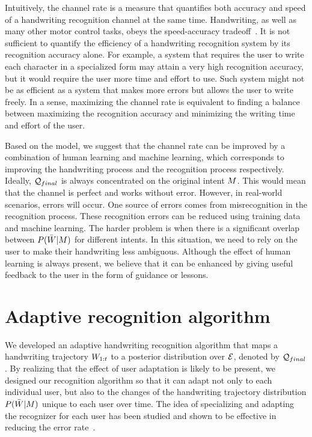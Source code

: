 \documentclass{sigchi}
\begin{document}
Intuitively, the channel rate is a measure that quantifies both
accuracy and speed of a handwriting recognition channel at the same
time. Handwriting, as well as many other motor control tasks, obeys
the speed-accuracy tradeoff~\cite{Fitts1954}. It is not sufficient to
quantify the efficiency of a handwriting recognition system by its
recognition accuracy alone. For example, a system that requires the
user to write each character in a specialized form may attain a very
high recognition accuracy, but it would require the user more time and
effort to use. Such system might not be as efficient as a system that
makes more errors but allows the user to write freely. In a sense,
maximizing the channel rate is equivalent to finding a balance between
maximizing the recognition accuracy and minimizing the writing time
and effort of the user.

Based on the model, we suggest that the channel rate can be improved
by a combination of human learning and machine learning, which
corresponds to improving the handwriting process and the recognition
process respectively. Ideally, $\mathcal{Q}_{final}$ is always concentrated
on the original intent $M$. This would mean that the channel is
perfect and works without error. However, in real-world scenarios,
errors will occur. One source of errors comes from misrecognition in
the recognition process. These recognition errors can be reduced using
training data and machine learning. The harder problem is when there
is a significant overlap between $P(\bar{W} | M)$ for different
intents. In this situation, we need to rely on the user to make
their handwriting less ambiguous. Although the effect of human
learning is always present, we believe that it can be enhanced by
giving useful feedback to the user in the form of guidance or lessons.


\section{Adaptive recognition algorithm}
\label{sec:recognition_algorithm}

\newcommand{\prototypeSet}{\mathcal{P}}

We developed an adaptive handwriting recognition algorithm that maps a
handwriting trajectory $W_{1:{t}}$ to a posterior distribution over
$\mathcal{E}$, denoted by $\mathcal{Q}_{final}$. By realizing that the effect of
user adaptation is likely to be present, we designed our recognition
algorithm so that it can adapt not only to each individual user, but
also to the changes of the handwriting trajectory distribution
$P(\bar{W} | M)$ unique to each user over time. The idea of specializing
and adapting the recognizer for each user has been studied and shown
to be effective in reducing the error rate~\cite{Connell2002, Matic93,
  Kienzle06}.
\end{document}
